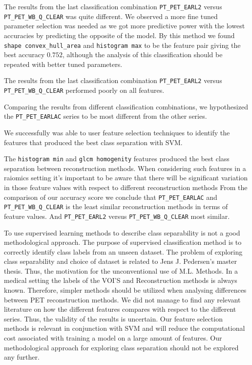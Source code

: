The results from the last classification combination
 \verb|PT_PET_EARL2| versus \verb|PT_PET_WB_Q_CLEAR| was quite different. 
 We observed a more fine tuned 
 parameter selection was needed as we got more predictive power with the lowest accuracies by predicting the 
 opposite of the model. By this method we found \verb|shape convex_hull_area| and \verb|histogram max| 
 to be the feature pair giving the best accuracy $0.752$, although the analysis of this classification 
 should be repeated with better tuned parameters. 

The results from the last classification combination
 \verb|PT_PET_EARL2| versus \verb|PT_PET_WB_Q_CLEAR| performed poorly on all
 features. 

 Comparing the results from different classification combinations, we hypothesized the \verb|PT_PET_EARLAC| 
 series to be most different from the other series. 


 We successfully was able to user feature selection techniques to identify the
 features that produced the best class separation with SVM.     

The \verb|histogram min| and \verb|glcm homogenity| features produced the best
class separation between reconstruction methods.     
When considering such features in a raiomics setting it's important to be
aware that there will be significant variation in those feature values with
respect to different reconstruction methods
From the comparison of our accuracy score we conclude that    
\verb|PT_PET_EARLAC| and \verb|PT_PET_WB_Q_CLEAR|
is the least similar reconstruction methods  in terms of feature values.   
And \verb|PT_PET_EARL2| versus \verb|PT_PET_WB_Q_CLEAR| most similar. 


To use supervised learning methods to describe class separability is not a
good methodological approach. The purpose of supervised classification
method is to correctly identify class labels from an unseen dataset.     
The problem of exploring class separability and choice of dataset is
related to Jens J. Pedersen's master thesis. Thus, the motivation for the 
unconventional use of M.L. Methods. In a medical setting the labels of the
VOI'S and Reconstruction methods is always known. Therefore, simpler methods
should be utilized when analysing differences between PET reconstruction
methods. We did not manage to find any relevant literature on how the different features compares
with respect to the different series. Thus, the validity of the results is
uncertain. Our feature selection methods is relevant in conjunction with SVM and
will reduce the computational cost associated with training a model on a large
amount of features. Our methodological approach for exploring class separation
should not be explored any further. 
 




% 
